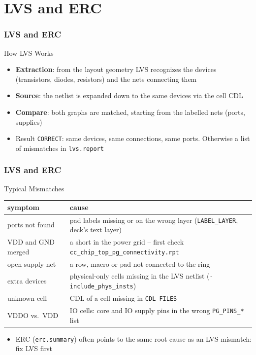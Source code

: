 \documentclass{beamer}
\newcommand{\astitle}{nix}
\newcommand{\assubtitle}{nix}
\newcommand{\cmd}[1]{\texttt{#1}}
\begin{document}
\section{LVS and ERC}
\renewcommand{\astitle}{LVS and ERC}

\renewcommand{\assubtitle}{How LVS Works}
\begin{frame}
\frametitle{\astitle}
\begin{block}{\assubtitle}
  \begin{itemize}
    \item \textbf{Extraction}: from the layout geometry LVS recognizes
      the devices (transistors, diodes, resistors) and the nets connecting
      them
    \item \textbf{Source}: the netlist is expanded down to the same
      devices via the cell CDL
    \item \textbf{Compare}: both graphs are matched, starting from the
      labelled nets (ports, supplies)
    \item Result \cmd{CORRECT}: same devices, same connections, same
      ports. Otherwise a list of mismatches in \cmd{lvs.report}
  \end{itemize}
\end{block}
\end{frame}

\renewcommand{\assubtitle}{Typical Mismatches}
\begin{frame}
\frametitle{\astitle}
\begin{block}{\assubtitle}
  \footnotesize
  \begin{tabularx}{\linewidth}{@{}lY@{}}
    \textbf{symptom} & \textbf{cause}\\\hline
    ports not found      & pad labels missing or on the wrong layer
                           (\cmd{LABEL\_LAYER}, deck's text layer)\\
    VDD and GND merged   & a short in the power grid -- first check
                           \cmd{cc\_chip\_top\_pg\_connectivity.rpt}\\
    open supply net      & a row, macro or pad not connected to the ring\\
    extra devices        & physical-only cells missing in the LVS netlist
                           (\cmd{-include\_phys\_insts})\\
    unknown cell         & CDL of a cell missing in \cmd{CDL\_FILES}\\
    VDDO vs.\ VDD        & IO cells: core and IO supply pins in the wrong
                           \cmd{PG\_PINS\_*} list\\
  \end{tabularx}
  \vspace{4pt}
  \begin{itemize}
    \item ERC (\cmd{erc.summary}) often points to the same root cause as
      an LVS mismatch: fix LVS first
  \end{itemize}
\end{block}
\end{frame}
\end{document}
